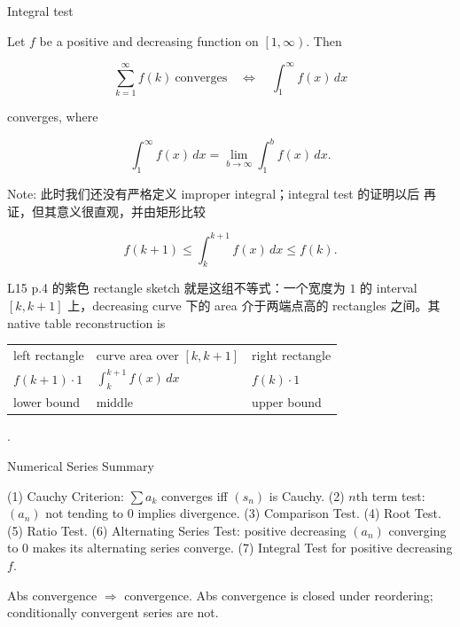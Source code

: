 \begin{theorem}{Integral test}

Let \(f\) be a positive and decreasing function on \(\left\lbrack {1,\infty} \right)\). Then

\[\sum\limits_{k = 1}^{\infty}f(k)\ \text{converges}\quad\Leftrightarrow\quad\int_{1}^{\infty}f(x)\, dx\]

converges, where

\[\int_{1}^{\infty}f(x)\, dx = \lim\limits_{b\rightarrow\infty}\int_{1}^{b}f(x)\, dx.\]

Note: 此时我们还没有严格定义 improper integral；integral test 的证明以后 再证，但其意义很直观，并由矩形比较

\[f\left( {k + 1} \right) \leq \int_{k}^{k + 1}f(x)\, dx \leq f(k).\]

L15 p.4 的紫色 rectangle sketch 就是这组不等式：一个宽度为 \(1\) 的 interval \(\left\lbrack {k,k + 1} \right\rbrack\) 上，decreasing curve 下的 area 介于两端点高的 rectangles 之间。其 native table reconstruction is

{\def\LTcaptype{none} %
\begin{longtable}[]{@{}lll@{}}
\toprule\noalign{}
\endhead
\bottomrule\noalign{}
\endlastfoot
left rectangle & curve area over \(\left\lbrack {k,k + 1} \right\rbrack\) & right rectangle \\
\(f\left( {k + 1} \right) \cdot 1\) & \(\int_{k}^{k + 1}f(x)\, dx\) & \(f(k) \cdot 1\) \\
lower bound & middle & upper bound \\
\end{longtable}
}

.

\end{theorem}

\begin{qlremark}{Numerical Series Summary}

(1) Cauchy Criterion: \(\sum a_{k}\) converges iff \(\left( s_{n} \right)\) is Cauchy. (2) \(n\)th term test: \(\left( a_{n} \right)\) not tending to \(0\) implies divergence. (3) Comparison Test. (4) Root Test. (5) Ratio Test. (6) Alternating Series Test: positive decreasing \(\left( a_{n} \right)\) converging to \(0\) makes its alternating series converge. (7) Integral Test for positive decreasing \(f\).

Abs convergence \(\Rightarrow\) convergence. Abs convergence is closed under reordering; conditionally convergent series are not.

\end{qlremark}
